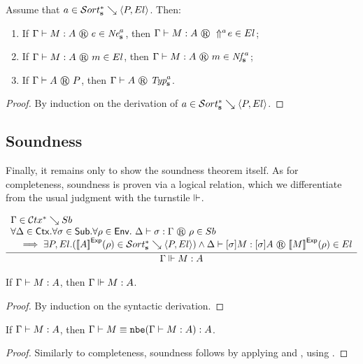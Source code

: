 \begin{theorem}
  \label{thm:realizability-gluing}
  Assume that $\glusortrel a P {El}$.  Then:
  \begin{enumerate}
  \item If $\glutmjudg \Gamma M A e {\glune a}$, then $\glutmjudg \Gamma M A {\dreflect a e} {El}$;
  \item If $\glutmjudg \Gamma M A m {El}$, then $\glutmjudg \Gamma M A m {\glunf a}$;
  \item If $\glutpjudg \Gamma A P$, then $\glutpjudg \Gamma A {\glutyp a}$.
  \end{enumerate}
\end{theorem}
\begin{proof}
  By induction on the derivation of $\glusortrel a P {El}$.
\end{proof}




\subsection{Soundness}

Finally, it remains only to show the soundness theorem itself.
As for completeness, soundness is proven via a logical relation, which we differentiate from the usual judgment with the turnstile $\Vdash$.

\[
\infer{
  \wfexpsound \Gamma M A
}{
  \begin{array}{l}
    \gluctxrel \Gamma {Sb}
    \\
    \forall \Delta \in \Ctx. \forall \sigma \in \Sub. \forall \rho \in \Env.\ \glusubjudg \Delta \sigma \Gamma \rho {Sb}
    \\
    \quad \implies \exists P,El. (\glusortrel {\evalexpfunc A \rho} P {El}) \land \glutmjudg \Delta {\tmclo \sigma M} {\tmclo \sigma A} {\evalexpfunc M \rho} {El}
  \end{array}
}
\]

\begin{theorem}
  \label{thm:fundamental-soundness}
  If $\Gamma \vdash M : A$, then $\Gamma \Vdash M : A$.
\end{theorem}
\begin{proof}
  By induction on the syntactic derivation.
\end{proof}

\begin{theorem}
  If $\Gamma \vdash M : A$, then $\Gamma \vdash M \equiv \texttt{nbe}(\Gamma \vdash M : A) : A$.
\end{theorem}
\begin{proof}
  Similarly to completeness, soundness follows by applying  and , using .
\end{proof}
